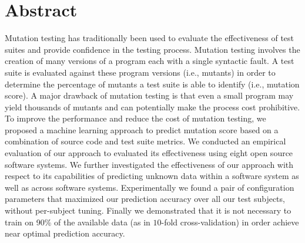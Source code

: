 \chapter*{Abstract}
Mutation testing has traditionally been used to evaluate the effectiveness of test suites and provide confidence in the testing process. Mutation testing involves the creation of many versions of a program each with a single syntactic fault. A test suite is evaluated against these program versions (i.e., mutants) in order to determine the percentage of mutants a test suite is able to identify (i.e., mutation score). A major drawback of mutation testing is that even a small program may yield thousands of mutants and can potentially make the process cost prohibitive. To improve the performance and reduce the cost of mutation testing, we proposed a machine learning approach to predict mutation score based on a combination of source code and test suite metrics. We conducted an empirical evaluation of our approach to evaluated its effectiveness using eight open source software systems. We further investigated the effectiveness of our approach with respect to its capabilities of predicting unknown data within a software system as well as across software systems. Experimentally we found a pair of configuration parameters that maximized our prediction accuracy over all our test subjects, without per-subject tuning. Finally we demonstrated that it is not necessary to train on 90\% of the available data (as in $10$-fold cross-validation) in order achieve near optimal prediction accuracy.
